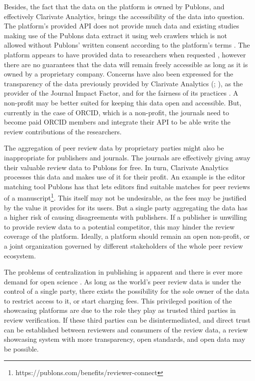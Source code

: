 Besides, the fact that the data on the platform is owned by Publons, and effectively Clarivate Analytics, brings the accessibility of the data into question. The platform’s provided API does not provide much data and existing studies making use of the Publons data extract it using web crawlers \parencite[952]{Ortega.2017} which is not allowed without Publons’ written consent according to the platform’s terms \parencite{publons_2014}. The platform appears to have provided data to researchers when requested \parencite[12]{Kovanis.2016}, however there are no guarantees that the data will remain freely accessible as long as it is owned by a proprietary company. Concerns have also been expressed for the transparency of the data previously provided by Clarivate Analytics (\cite{Rossner.2007}; \cite[3]{TeixeiradaSilva.2019}), as the provider of the Journal Impact Factor, and for the fairness of its practices \parencite{TeixeiradaSilva.2013}. A non-profit may be better suited for keeping this data open and accessible. But, currently in the case of \acrshort{ORCID}, which is a non-profit, the journals need to become paid \acrshort{ORCID} members and integrate their \acrshort{API} to be able write the review contributions of the researchers.

The aggregation of peer review data by proprietary parties might also be inappropriate for publishers and journals. The journals are effectively giving away their valuable review data to Publons for free. In turn, Clarivate Analytics processes this data and makes use of it for their profit. An example is the editor matching tool Publons has that lets editors find suitable matches for peer reviews of a manuscript\footnote{https://publons.com/benefits/reviewer-connect}. This itself may not be undesirable, as the fees may be justified by the value it provides for its users. But a single party aggregating the data has a higher risk of causing disagreements with publishers. If a publisher is unwilling to provide review data to a potential competitor, this may hinder the review coverage of the platform. Ideally, a platform should remain an open non-profit, or a joint organization governed by different stakeholders of the whole peer review ecosystem.

The problems of centralization in publishing is apparent \parencite{Lariviere.2015} and there is ever more demand for open science \parencite[1-3]{Piwowar.2018}. As long as the world’s peer review data is under the control of a single party, there exists the possibility for the sole owner of the data to restrict access to it, or start charging fees. This privileged position of the showcasing platforms are due to the role they play as trusted third parties in review verification. If these third parties can be disintermediated, and direct trust can be established between reviewers and consumers of the review data, a review showcasing system with more transparency, open standards, and open data may be possible.

